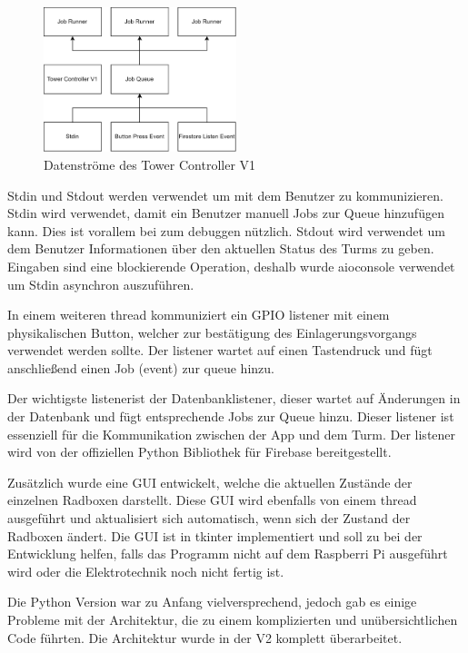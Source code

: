 \begin{figure}
  \centering
  \includegraphics[width=0.5\textwidth]{images/tower_controller_v1.png}
  \caption{Datenströme des Tower Controller V1}
  \label{fig:tower_controller_v1}
\end{figure}

\ac{Stdin} und \ac{Stdout} werden verwendet um mit dem Benutzer zu kommunizieren. \ac{Stdin} wird verwendet, damit ein Benutzer manuell Jobs zur Queue hinzufügen kann. Dies ist vorallem bei zum \Gls{debuggen} nützlich. \ac{Stdout} wird verwendet um dem Benutzer Informationen über den aktuellen Status des Turms zu geben. Eingaben sind eine blockierende Operation, deshalb wurde aioconsole verwendet um \ac{Stdin} asynchron auszuführen.

In einem weiteren \Gls{thread} kommuniziert ein \ac{GPIO} \Gls{listener} mit einem physikalischen Button, welcher zur bestätigung des Einlagerungsvorgangs verwendet werden sollte. Der \Gls{listener} wartet auf einen Tastendruck und fügt anschließend einen Job (\Gls{event}) zur \Gls{queue} hinzu.

Der wichtigste \Gls{listener}ist der Datenbanklistener, dieser wartet auf Änderungen in der Datenbank und fügt entsprechende Jobs zur Queue hinzu. Dieser \Gls{listener} ist essenziell für die Kommunikation zwischen der App und dem Turm. Der \Gls{listener} wird von der offiziellen Python Bibliothek für Firebase bereitgestellt.

Zusätzlich wurde eine \ac{GUI} entwickelt, welche die aktuellen Zustände der einzelnen Radboxen darstellt. Diese \ac{GUI} wird ebenfalls von einem \Gls{thread} ausgeführt und aktualisiert sich automatisch, wenn sich der Zustand der Radboxen ändert. Die \ac{GUI} ist in tkinter implementiert und soll zu bei der Entwicklung helfen, falls das Programm nicht auf dem Raspberri Pi ausgeführt wird oder die Elektrotechnik noch nicht fertig ist.

Die Python Version war zu Anfang vielversprechend, jedoch gab es einige Probleme mit der Architektur, die zu einem komplizierten und unübersichtlichen Code führten. Die Architektur wurde in der V2 komplett überarbeitet.


